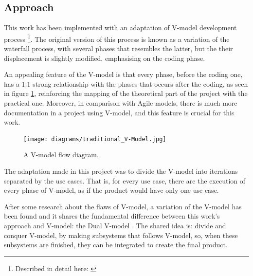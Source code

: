 \subsection{Approach}
This work has been implemented with an adaptation of V-model development process
\footnote{Described in detail here: \cite{mathur2010advancements}}.
The original version of this process is known as a variation of the waterfall process,
with several phases that resembles the latter,
but the their displacement is slightly modified,
emphasising on the coding phase.

An appealing feature of the V-model is that every phase,
before the coding one,
has a 1:1 strong relationship with the phases that occurs after the coding,
as seen in figure \ref{fig:v-model},
reinforcing the mapping of the theoretical part of the project with the practical one.
Moreover,
in comparison with Agile models,
there is much more documentation in a project using V-model,
and this feature is crucial for this work.

\begin{figure}[h]
    \centering
    \texttt{[image: diagrams/traditional\_V-Model.jpg]}
    \caption{A V-model flow diagram. \cite{vmodelCMU}}
    \label{fig:v-model}
\end{figure}

The adaptation made in this project was to divide the V-model into iterations separated by the use cases.
That is,
for every use case,
there are the execution of every phase of V-model,
as if the product would have only one use case.

After some research about the flaws of V-model,
a variation of the V-model has been found and it shares the fundamental difference between this work's approach and V-model:
the Dual V-model \cite{clark2009system}.
The shared idea is: divide and conquer V-model, 
by making subsystems that follows V-model,
so,
when these subsystems are finished,
they can be integrated to create the final product.


